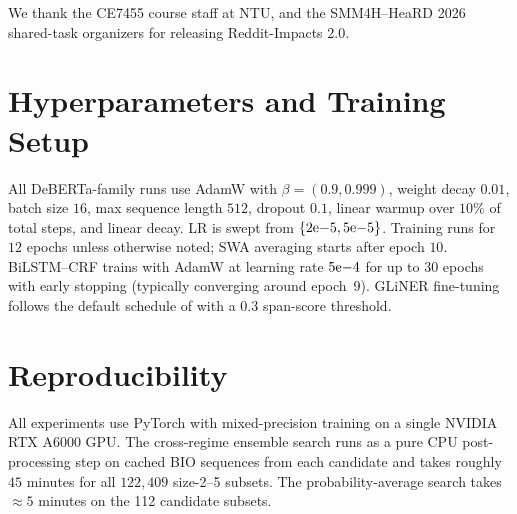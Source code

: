 \documentclass[11pt]{article}
\begin{document}
We thank the CE7455 course staff at NTU, and the SMM4H--HeaRD 2026
shared-task organizers for releasing Reddit-Impacts 2.0.



\appendix

\section{Hyperparameters and Training Setup}
\label{sec:hyperparams}

All DeBERTa-family runs use AdamW with $\beta = (0.9, 0.999)$,
weight decay $0.01$, batch size $16$, max sequence length $512$,
dropout $0.1$, linear warmup over $10\%$ of total steps, and linear
decay. LR is swept from $\{2{\rm e}{-5}, 5{\rm e}{-5}\}$. Training
runs for $12$ epochs unless otherwise noted; SWA averaging starts
after epoch $10$. BiLSTM--CRF trains with AdamW at learning rate
$5{\rm e}{-4}$ for up to $30$ epochs with early stopping (typically
converging around epoch~9). GLiNER fine-tuning follows the default schedule of
\citet{zaratiana2024gliner} with a $0.3$ span-score threshold.

\section{Reproducibility}
\label{sec:repro}

All experiments use PyTorch with mixed-precision training on a single
NVIDIA RTX A6000 GPU. The cross-regime ensemble search runs as a pure CPU
post-processing step on cached BIO sequences from each candidate and
takes roughly $45$ minutes for all $122{,}409$ size-2--5 subsets. The
probability-average search takes $\approx 5$ minutes on the 112
candidate subsets.
\end{document}
